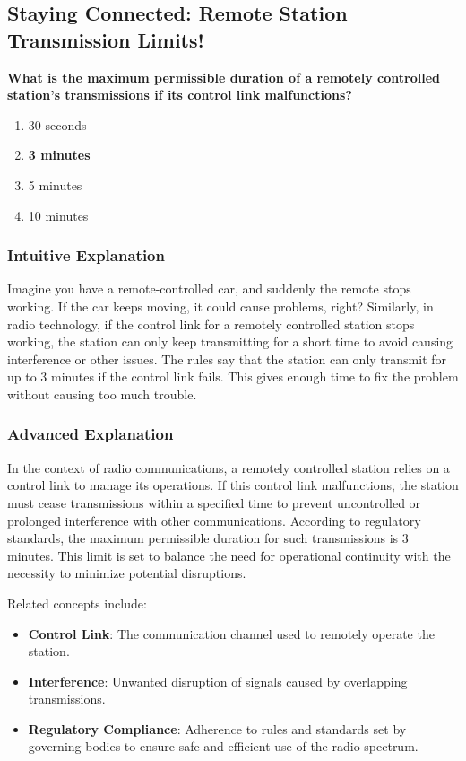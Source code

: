 \subsection{Staying Connected: Remote Station Transmission Limits!}
\label{sec:E1C08}

\begin{tcolorbox}[colback=gray!10!white,colframe=black!75!black,title={\textbf{E1C08}}]
\textbf{What is the maximum permissible duration of a remotely controlled station’s transmissions if its control link malfunctions?}
\begin{enumerate}[label=\Alph*,noitemsep]
    \item 30 seconds
    \item \textbf{3 minutes}
    \item 5 minutes
    \item 10 minutes
\end{enumerate}
\end{tcolorbox}

\subsubsection{Intuitive Explanation}
Imagine you have a remote-controlled car, and suddenly the remote stops working. If the car keeps moving, it could cause problems, right? Similarly, in radio technology, if the control link for a remotely controlled station stops working, the station can only keep transmitting for a short time to avoid causing interference or other issues. The rules say that the station can only transmit for up to 3 minutes if the control link fails. This gives enough time to fix the problem without causing too much trouble.

\subsubsection{Advanced Explanation}
In the context of radio communications, a remotely controlled station relies on a control link to manage its operations. If this control link malfunctions, the station must cease transmissions within a specified time to prevent uncontrolled or prolonged interference with other communications. According to regulatory standards, the maximum permissible duration for such transmissions is 3 minutes. This limit is set to balance the need for operational continuity with the necessity to minimize potential disruptions.


Related concepts include:
\begin{itemize}
    \item \textbf{Control Link}: The communication channel used to remotely operate the station.
    \item \textbf{Interference}: Unwanted disruption of signals caused by overlapping transmissions.
    \item \textbf{Regulatory Compliance}: Adherence to rules and standards set by governing bodies to ensure safe and efficient use of the radio spectrum.
\end{itemize}

